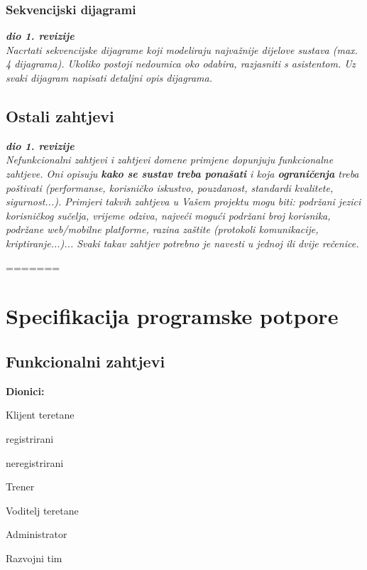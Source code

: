 					
				\eject	
				
		    
				
			\subsection{Sekvencijski dijagrami}
				
				\textbf{\textit{dio 1. revizije}}\\
				
				\textit{Nacrtati sekvencijske dijagrame koji modeliraju najvažnije dijelove sustava (max. 4 dijagrama). Ukoliko postoji nedoumica oko odabira, razjasniti s asistentom. Uz svaki dijagram napisati detaljni opis dijagrama.}
				\eject
	
		\section{Ostali zahtjevi}
		
			\textbf{\textit{dio 1. revizije}}\\
		 
			 \textit{Nefunkcionalni zahtjevi i zahtjevi domene primjene dopunjuju funkcionalne zahtjeve. Oni opisuju \textbf{kako se sustav treba ponašati} i koja \textbf{ograničenja} treba poštivati (performanse, korisničko iskustvo, pouzdanost, standardi kvalitete, sigurnost...). Primjeri takvih zahtjeva u Vašem projektu mogu biti: podržani jezici korisničkog sučelja, vrijeme odziva, najveći mogući podržani broj korisnika, podržane web/mobilne platforme, razina zaštite (protokoli komunikacije, kriptiranje...)... Svaki takav zahtjev potrebno je navesti u jednoj ili dvije rečenice.}
			 
			 
			 
=======
\chapter{Specifikacija programske potpore}
		
	\section{Funkcionalni zahtjevi}
			
			
			\noindent \textbf{Dionici:}
			
			\begin{packed_enum}
				
				\item Klijent teretane
				\begin{packed_enum}
					
					\item registrirani
					\item neregistrirani
					
				\end{packed_enum}
				\item Trener
				\item Voditelj teretane			
				\item Administrator
				\item Razvojni tim
				
			\end{packed_enum}
			
